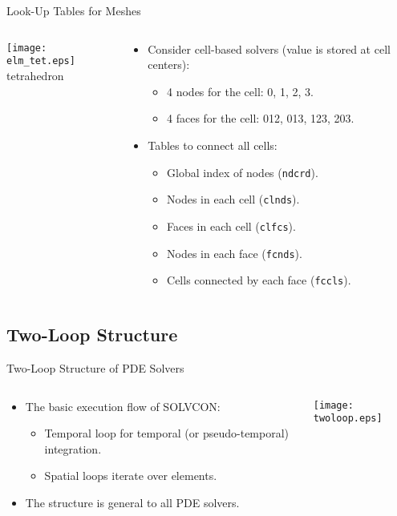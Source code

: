 \documentclass[dvips,xcolor=pst,14pt]{beamer}
\begin{document}
\begin{frame}{
%
Look-Up Tables for Meshes
%
}
\begin{columns}[c]
\begin{column}{.3\textwidth}
\begin{center}
  \texttt{[image: elm\_tet.eps]} \\ \footnotesize tetrahedron
\end{center}\end{column}
\begin{column}{.7\textwidth}
\begin{itemize}
  \item Consider cell-based solvers (value is stored at cell centers):
  \begin{itemize}
    \item 4 nodes for the cell: 0, 1, 2, 3.
    \item 4 faces for the cell: 012, 013, 123, 203.
  \end{itemize}
  \item Tables to connect all cells:
  \begin{itemize}
    \item Global index of nodes (\texttt{ndcrd}).
    \item Nodes in each cell (\texttt{clnds}).
    \item Faces in each cell (\texttt{clfcs}).
    \item Nodes in each face (\texttt{fcnds}).
    \item Cells connected by each face (\texttt{fccls}).
  \end{itemize}
\end{itemize}
\end{column}
\end{columns}
\end{frame}

\subsection{
Two-Loop Structure
}

\begin{frame}{
%
Two-Loop Structure of PDE Solvers
%
}
\begin{columns}[c]
\begin{column}{.5\textwidth}
\begin{itemize}
  \item The basic execution flow of SOLVCON:
  \begin{itemize}
    \item Temporal loop for temporal (or pseudo-temporal) integration.
    \item Spatial loops iterate over elements.
  \end{itemize}
  \item The structure is general to all PDE solvers.
\end{itemize}
\end{column}
\begin{column}{.5\textwidth}
  \texttt{[image: twoloop.eps]}
\end{column}
\end{columns}
\end{frame}
\end{document}
